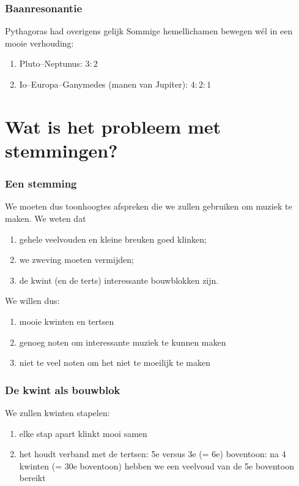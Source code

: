 \documentclass[compress, darktitle, framenumber, totalframenumber, handout]{beamer}
\newenvironment{danger}{\medbreak\noindent\hangindent=2pc\hangafter=-2%
  \clubpenalty=10000%
  \hbox to0pt{\hskip-\hangindent\dbend\hfill}\small\ignorespaces}%
  {\medbreak\par}
\begin{document}
\begin{frame}
  \frametitle{Baanresonantie}

  \begin{block}{Pythagoras had overigens gelijk}
    Sommige hemellichamen bewegen w\'el in een mooie verhouding:
    \begin{enumerate}
      \item Pluto--Neptunus: $3:2$
      \item Io--Europa--Ganymedes (manen van Jupiter): $4:2:1$
    \end{enumerate}
  \end{block}

  \pause

\end{frame}

\section{Wat is het probleem met stemmingen?}

\begin{frame}[label=tunings]
  \frametitle{Een stemming}

  We moeten dus toonhoogtes afspreken die we zullen gebruiken om muziek te maken. We weten dat
  \begin{enumerate}
    \item gehele veelvouden en kleine breuken goed klinken;
    \item we zweving moeten vermijden;
    \item de kwint (en de terts) interessante bouwblokken zijn.
  \end{enumerate}
  \pause
  We willen dus:
  \begin{enumerate}
    \item mooie kwinten en tertsen
    \item genoeg noten om interessante muziek te kunnen maken
    \item niet te veel noten om het niet te moeilijk te maken
  \end{enumerate}
\end{frame}

\begin{frame}
  \frametitle{De kwint als bouwblok}

  We zullen kwinten stapelen:
  \begin{enumerate}
    \item elke stap apart klinkt mooi samen
    \item het houdt verband met de tertsen: 5e versus 3e (= 6e) boventoon: na 4 kwinten (= 30e boventoon) hebben we een veelvoud van de 5e boventoon bereikt
  \end{enumerate}
\end{frame}
\end{document}
